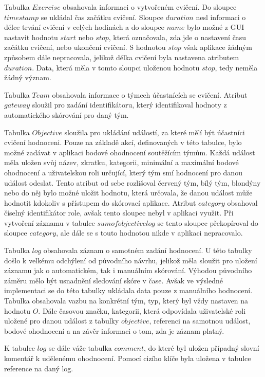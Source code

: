 \documentclass[
  digital, %
  twoside, %
  table,   %
  nolof,     %
  nolot,     %
]{fithesis3}
\begin{document}
Tabulka $Exercise$ obsahovala informaci o vytvořeném cvičení. Do sloupce $timestamp$ se ukládal čas začátku cvičení. Sloupce $duration$ nesl informaci o délce trvání cvičení v celých hodinách a do sloupce $name$ bylo možné z GUI nastavit hodnotu $start$ nebo $stop$, která označovala, zda jde o nastavení času začátku cvičení, nebo ukončení cvičení. S hodnotou $stop$ však aplikace žádným způsobem dále nepracovala, jelikož délka cvičení byla nastavena atributem $duration$. Data, která měla v tomto sloupci uloženou hodnotu $stop$, tedy neměla žádný význam.

Tabulka $Team$ obsahovala informace o týmech účastnících se cvičení. Atribut $gateway$ sloužil pro zadání identifikátoru, který identifikoval hodnoty z automatického skórování pro daný tým.

Tabulka $Objective$ sloužila pro ukládání událostí, za které mělí být účastníci cvičení hodnoceni. Pouze na základě akcí, definovaných v této tabulce, bylo možné zadávat v aplikaci bodové ohodnocení soutěžícím týmům. Každá událost měla uložen svůj název, zkratku, kategorii, minimální a maximální bodové ohodnocení a uživatelskou roli určující, který tým smí hodnocení pro danou událost odeslat. Tento atribut od sebe rozlišoval červený tým, bílý tým, blondýny nebo do něj bylo možné uložit hodnotu, která určovala, že danou událost může hodnotit kdokoliv s přístupem do skórovací aplikace. Atribut $category$ obsahoval číselný identifikátor role, avšak tento sloupec nebyl v aplikaci využit. Při vytvoření záznamu v tabulce $sumofobjectivelog$ se tento sloupec překopíroval do sloupce $category$, ale dále se s touto hodnotou nikde v aplikaci nepracovalo.

Tabulka $log$ obsahovala záznam o samotném zadání hodnocení. U této tabulky došlo k velkému odchýlení od původního návrhu, jelikož měla sloužit pro uložení záznamu jak o automatickém, tak i manuálním skórování. Výhodou původního záměru mělo být usnadnění sledování skóre v čase. Avšak ve výsledné implementaci se do této tabulky ukládala data pouze z manuálního hodnocení. Tabulka obsahovala vazbu na konkrétní tým, typ, který byl vždy nastaven na hodnotu $O$. Dále časovou značku, kategorii, která odpovídala uživatelské roli uložené pro danou událost z tabulky $objective$, referenci na samotnou událost, bodové ohodnocení a na závěr informaci o tom, zda je záznam platný. 

K tabulce $log$ se dále váže tabulka $comment$, do které byl uložen případný slovní komentář k udělenému ohodnocení. Pomocí cizího klíče byla uložena v tabulce reference na daný log.
\end{document}
